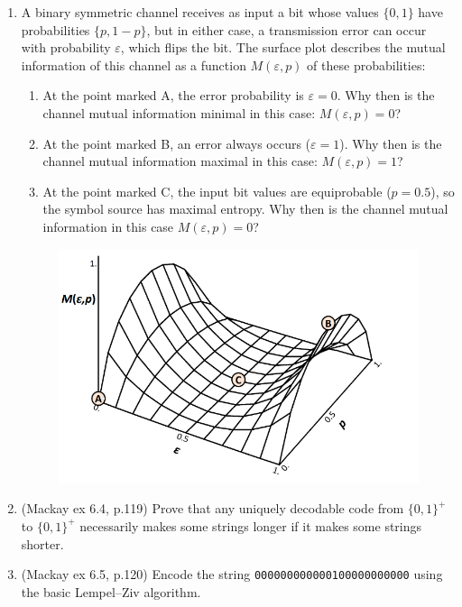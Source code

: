 \documentclass[11pt,a4paper]{article}
\begin{document}
\begin{enumerate}
    \item A binary symmetric channel receives as input a bit whose values $\{0,1\}$ have probabilities $\{p, 1-p\}$, but in either case, a transmission error can occur with probability $\varepsilon$, which flips the bit.  
    The surface plot describes the mutual information of this channel as a function $M(\varepsilon, p)$ of these probabilities:
    \begin{enumerate}
        \item At the point marked A, the error probability is $\varepsilon = 0$.  
        Why then is the channel mutual information minimal in this case: $M(\varepsilon, p) = 0$?

        \item At the point marked B, an error always occurs ($\varepsilon = 1$).  
        Why then is the channel mutual information maximal in this case: $M(\varepsilon, p) = 1$?

        \item At the point marked C, the input bit values are equiprobable ($p = 0.5$), so the symbol source has maximal entropy.  
        Why then is the channel mutual information in this case $M(\varepsilon, p) = 0$?
    \end{enumerate}

    \begin{figure}
        \centering
        \includegraphics[width=0.7\linewidth]{tex/Screenshot 2024-11-18 194222.png}
        \label{fig:placeholder}
    \end{figure}

    \item (Mackay ex 6.4, p.119) Prove that any uniquely decodable code from $\{0,1\}^+$ to $\{0,1\}^+$ necessarily makes some strings longer if it makes some strings shorter.

    \item (Mackay ex 6.5, p.120) Encode the string \verb|000000000000100000000000| using the basic Lempel–Ziv algorithm.
\end{enumerate}
\end{document}
